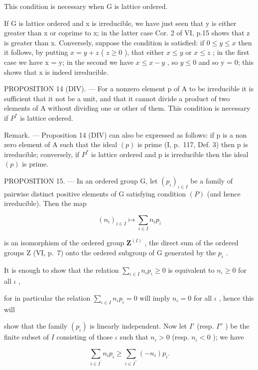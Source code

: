 This condition is necessary when G is lattice ordered.

If G is lattice ordered and x is irreducible, we have just seen that y is either greater than x or coprime to x; in the latter case Cor. 2 of VI, p.15 shows that z is greater than x. Conversely, suppose the condition is satisfied: if \(0 \leqslant y \leqslant x\) then it follows, by putting \(x = y + z\) ( \(z \geqslant 0\) ), that either \(x \leqslant y\) or \(x \leqslant z\) ; in the first case we have x = y; in the second we have \(x \leqslant x - y\) , so \(y \leqslant 0\) and so y = 0; this shows that x is indeed irreducible.

PROPOSITION 14 (DIV). --- For a nonzero element p of A to be irreducible it is sufficient that it not be a unit, and that it cannot divide a product of two elements of A without dividing one or other of them. This condition is necessary if \(P^{*}\) is lattice ordered.

Remark. --- Proposition 14 (DIV) can also be expressed as follows: if p is a non zero element of A such that the ideal \((p)\) is prime (I, p.~117, Def. 3) then p is irreducible; conversely, if \(P^{*}\) is lattice ordered and p is irreducible then the ideal \((p)\) is prime.

PROPOSITION 15. --- In an ordered group G, let \((p_{\iota})_{\iota \in I}\) be a family of pairwise distinct positive elements of G satisfying condition \((P)\) (and hence irreducible). Then the map

\[
(n _ {i}) _ {i \in I} \mapsto \sum_ {i \in I} n _ {i} p _ {i}
\]

is an isomorphism of the ordered group \(\mathbf{Z}^{(I)}\) , the direct sum of the ordered groups Z (VI, p.~7) onto the ordered subgroup of G generated by the \(p_{i}\) .

It is enough to show that the relation \(\sum_{\iota \in I} n_{\iota} p_{\iota} \geqslant 0\) is equivalent to \(n_{\iota} \geqslant 0\) for all \(\iota\) ,

for in particular the relation \(\sum_{\iota \in I} n_{\iota} p_{\iota} = 0\) will imply \(n_{\iota} = 0\) for all \(\iota\) , hence this will

show that the family \((p_{\iota})\) is linearly independent. Now let \(I'\) (resp. \(I''\) ) be the finite subset of \(I\) consisting of those \(\iota\) such that \(n_{\iota} > 0\) (resp. \(n_{\iota} < 0\) ); we have

\[
\sum_ {i \in I ^ {\prime}} n _ {i} p _ {i} \geqslant \sum_ {i \in I ^ {\prime \prime}} (- n _ {i}) p _ {i}.
\]

